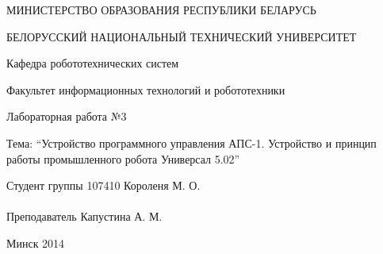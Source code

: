 \begin{titlepage} %

\thispagestyle{empty} %

\begin{center}
МИНИСТЕРСТВО ОБРАЗОВАНИЯ РЕСПУБЛИКИ БЕЛАРУСЬ

БЕЛОРУССКИЙ НАЦИОНАЛЬНЫЙ ТЕХНИЧЕСКИЙ УНИВЕРСИТЕТ

Кафедра робототехнических систем

Факультет информационных технологий и робототехники
\end{center}

\vfill

\begin{center}
Лабораторная работа №3

Тема: ``Устройство программного управления АПС-1. Устройство и принцип работы промышленного робота Универсал 5.02''
\end{center}

\vfill

\noindent
Студент группы 107410 \hfill Короленя М. О.
\\
\\
\noindent
Преподаватель \hfill Капустина А. М.

\vfill

\centerline{Минск 2014}

\clearpage %

\end{titlepage}

\setcounter{page}{2}
